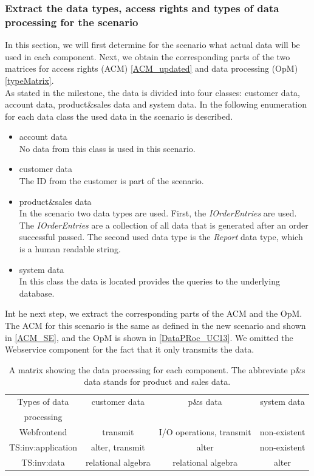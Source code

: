 \subsubsection{Extract the data types, access rights and types of data processing for the scenario}
In this section, we will first determine for the scenario what actual data will be used in each component. Next, we obtain the corresponding parts of the two matrices for access rights (ACM) \autoref{ACM_updated} and data processing (OpM) \autoref{typeMatrix}.\\
As stated in the milestone, the data is divided into four classes: customer data, account data, product\&sales data and system data. In the following enumeration for each data class the used data in the scenario is described.
\begin{itemize}
\item account data \\ No data from this class is used in this scenario.
\item customer data\\ The ID from the customer is part of the scenario.
\item product\&sales data\\ In the scenario two data types are used. First, the \textit{IOrderEntries} are used. The \textit{IOrderEntries} are a collection of all data that is generated after an order successful passed. The second used data type is the \textit{Report} data type, which is a human readable string. 
\item system data \\ In this class the data is located provides the queries to the underlying database.
\end{itemize}

Int he next step, we extract the corresponding parts of the ACM and the OpM. The ACM for this scenario is the same as defined in the new scenario and shown in \autoref{ACM_SE},  and the OpM is shown in \autoref{DataPRoc_UC13}. We omitted the Webservice component for the fact that it only transmits the data.\\

\begin{table}
\begin{tabular}{|c|c|c|c|}
\hline 
Types of data & customer data & p\&s data & system data \\
 processing & & & \\
\hline 
Webfrontend & transmit & I/O operations, transmit & non-existent \\ 
\hline 
TS:inv:application & alter, transmit & alter & non-existent \\ 
\hline 
TS:inv:data & relational algebra & relational algebra & alter \\ 
\hline 
\end{tabular} 
\caption{A matrix showing the data processing for each component. The abbreviate p\&s data stands for product and sales data.}
\label{DataPRoc_UC14}
\end{table}

